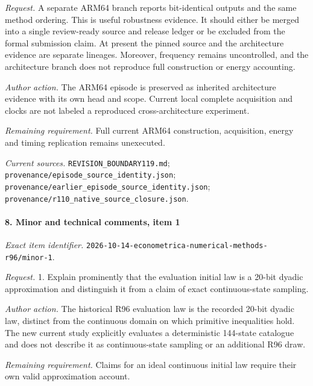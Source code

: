 \par\emph{Request.} A separate ARM64 branch reports bit-identical outputs and the same method ordering. This is useful robustness evidence. It should either be merged into a single review-ready source and release ledger or be excluded from the formal submission claim. At present the pinned source and the architecture evidence are separate lineages. Moreover, frequency remains uncontrolled, and the architecture branch does not reproduce full construction or energy accounting.

\par\emph{Author action.} The ARM64 episode is preserved as inherited architecture evidence with its own head and scope. Current local complete acquisition and clocks are not labeled a reproduced cross-architecture experiment.

\par\emph{Remaining requirement.} Full current ARM64 construction, acquisition, energy and timing replication remains unexecuted.

\par\emph{Current sources.} \nolinkurl{REVISION_BOUNDARY119.md}; \nolinkurl{provenance/episode_source_identity.json}; \nolinkurl{provenance/earlier_episode_source_identity.json}; \nolinkurl{provenance/r110_native_source_closure.json}.

\paragraph{8. Minor and technical comments, item 1}

\emph{Exact item identifier.} \nolinkurl{2026-10-14-econometrica-numerical-methods-r96/minor-1}.

\par\emph{Request.} 1. Explain prominently that the evaluation initial law is a 20-bit dyadic approximation and distinguish it from a claim of exact continuous-state sampling.

\par\emph{Author action.} The historical R96 evaluation law is the recorded 20-bit dyadic law, distinct from the continuous domain on which primitive inequalities hold. The new current study explicitly evaluates a deterministic 144-state catalogue and does not describe it as continuous-state sampling or an additional R96 draw.

\par\emph{Remaining requirement.} Claims for an ideal continuous initial law require their own valid approximation account.

